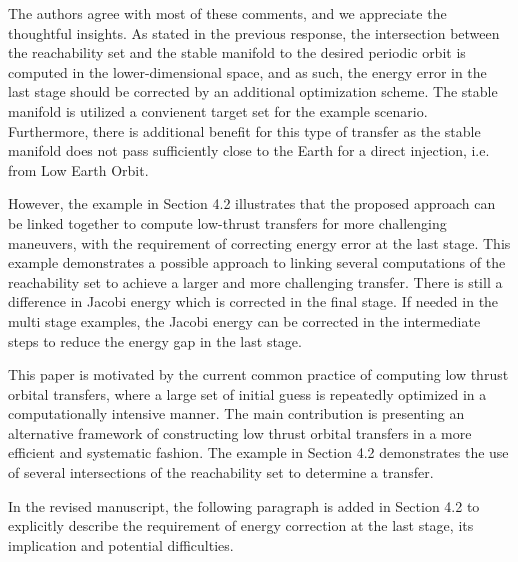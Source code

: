 \documentclass[11pt]{article}
\begin{document}
\begin{itemize}
        The authors agree with most of these comments, and we appreciate the thoughtful insights. 
        As stated in the previous response, the intersection between the reachability set and the stable manifold to the desired periodic orbit is computed in the lower-dimensional space, and as such, the energy error in the last stage should be corrected by an additional optimization scheme. 
        The stable manifold is utilized a convienent target set for the example scenario. 
        Furthermore, there is additional benefit for this type of transfer as the stable manifold does not pass sufficiently close to the Earth for a direct injection, i.e. from Low Earth Orbit.

        However, the example in Section 4.2 illustrates that the proposed approach can be linked together to compute low-thrust transfers for more challenging maneuvers, with the requirement of correcting energy error at the last stage. 
        This example demonstrates a possible approach to linking several computations of the reachability set to achieve a larger and more challenging transfer.
        There is still a difference in Jacobi energy which is corrected in the final stage.
        If needed in the multi stage examples, the Jacobi energy can be corrected in the intermediate steps to reduce the energy gap in the last stage. 

        This paper is motivated by the current common practice of computing low thrust orbital transfers, where a large set of initial guess is repeatedly optimized in a computationally intensive manner. 
        The main contribution is presenting an alternative framework of constructing low thrust orbital transfers in a more efficient and systematic fashion. 
        The example in Section 4.2 demonstrates the use of several intersections of the reachability set to determine a transfer.

        In the revised manuscript, the following paragraph is added in Section 4.2 to explicitly describe the requirement of energy correction at the last stage, its implication and potential difficulties. 


\end{itemize}
\end{document}
